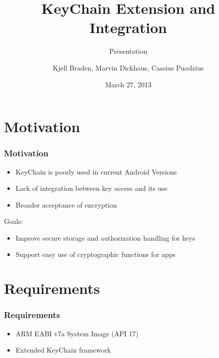 \documentclass{beamer}
\title{KeyChain Extension and Integration}
\subtitle{Presentation}
\author[Braden, Dickhaus, Puodzius]{Kjell Braden, Marvin Dickhaus, Cassius Puodzius}
\institute{Fachbereich Informatik \\ TU Darmstadt}
\date{March 27, 2013}
\begin{document}
\begin{frame}
	\titlepage
\end{frame}
\begin{frame}
	\tableofcontents
\end{frame}

\section{Motivation}
	\begin{frame}
		\tableofcontents[currentsection]
	\end{frame}
	\begin{frame}
	\frametitle{Motivation}
	\begin{itemize}
		\item KeyChain is poorly used in current Android Versions
		\item Lack of integration between key access and its use
		\item Broader acceptance of encryption %
	\end{itemize}
	Goals:
	\begin{itemize}
		\item Improve secure storage and authorization handling for keys
		\item Support easy use of cryptographic functions for apps
	\end{itemize}	
	\end{frame}

\section{Requirements}
	\begin{frame}
		\tableofcontents[currentsection]
	\end{frame}
	\begin{frame}
	\frametitle{Requirements}
		\begin{itemize}
			\item ARM EABI v7a System Image (API 17)
			\item Extended KeyChain framework
		\end{itemize}
	\end{frame}
\end{document}
